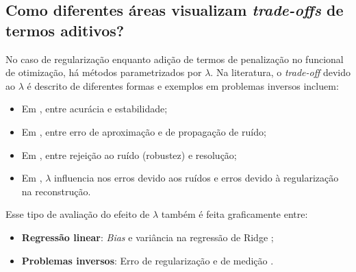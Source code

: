 \subsection{Como diferentes áreas visualizam \textit{trade-offs} de termos aditivos?} 
No caso de regularização enquanto adição de termos de penalização no funcional de otimização, há métodos parametrizados por $\lambda$. Na literatura, o \textit{trade-off} devido ao $\lambda$ é descrito de diferentes formas e exemplos em problemas inversos incluem:
\begin{itemize}
 \item Em \cite[págs. 2804-5]{Chen2002}, entre acurácia e estabilidade;
 \item  Em \cite[Equações 4.41-2]{Bertero2021}, entre erro de aproximação e de propagação de ruído;
 \item Em \cite{Braun2017}, entre rejeição ao ruído (robustez) e resolução;
   \item Em \cite[Subseção 4.8]{aster2019parameter}, $\lambda$ influencia nos erros devido aos ruídos e erros devido à regularização na reconstrução.
   \end{itemize}

Esse tipo de avaliação do efeito de $\lambda$ também é feita graficamente entre: 
\begin{itemize}
 \item \textbf{Regressão linear}: \textit{Bias} e variância na regressão de Ridge \cite[Figura 1]{Hoerl1970};
   \item  \textbf{Problemas inversos}: Erro de regularização e de medição \cite[Figura 4.1]{Seo2012}.
   \end{itemize}
   

